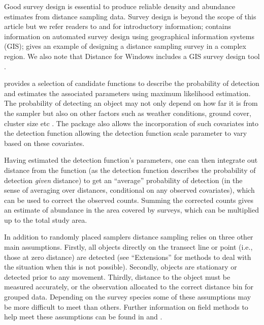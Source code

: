 \documentclass[article]{jss}\usepackage[]{graphicx}\usepackage[]{color}
\begin{document}
Good survey design is essential to produce reliable density and abundance estimates from distance sampling data. Survey design is beyond the scope of this article but we refer readers to \cite[][Chapter 7]{Buckland:2001vm} and \cite[][Chapter 2]{buckland2015distance} for introductory information; \cite{Strindberg:2004vr} contains information on automated survey design using geographical information systems (GIS); \cite{Thomas:2007wz} gives an example of designing a distance sampling survey in a complex region. We also note that Distance for Windows includes a GIS survey design tool \citep{Thomas:2010cf}.

 provides a selection of candidate functions to describe the probability of detection and estimates the associated parameters using maximum likelihood estimation. The probability of detecting an object may not only depend on how far it is from the sampler but also on other factors such as weather conditions, ground cover, cluster size etc \citep{Marques:2007ey}. The  package also allows the incorporation of such covariates into the detection function allowing the detection function scale parameter to vary based on these covariates.

Having estimated the detection function's parameters, one can then integrate out distance from the function (as the detection function describes the probability of detection \textit{given} distance) to get an ``average'' probability of detection (in the sense of averaging over distances, conditional on any observed covariates), which can be used to correct the observed counts. Summing the corrected counts gives an estimate of abundance in the area covered by surveys, which can be multiplied up to the total study area.

In addition to randomly placed samplers distance sampling relies on three other main assumptions. Firstly, all objects directly on the transect line or point (i.e., those at zero distance) are detected (see ``Extensions'' for methods to deal with the situation when this is not possible). Secondly, objects are stationary or detected prior to any movement. Thirdly, distance to the object must be measured accurately, or the observation allocated to the correct distance bin for grouped data. Depending on the survey species some of these assumptions may be more difficult to meet than others. Further information on field methods to help meet these assumptions can be found in \cite{Buckland:2001vm} and \cite{buckland2015distance}.
\end{document}
